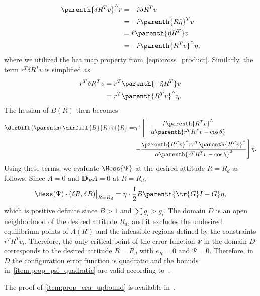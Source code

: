 \begin{align*}
    \parenth{\delta R^T v}^\wedge r &= - \hat{r} \delta R ^T v  \\
    &= - \hat{r} \parenth{R \hat \eta}^T v  \\
    &= \hat{r} \parenth{\hat{\eta} R^T } v  \\
    &= - \hat{r} \parenth{R^T v}^\wedge \eta ,
\end{align*}
where we utilized the hat map property from~\cref{eqn:cross_product}.
Similarly, the term \( r^T \delta R^T v \) is simplified as
\begin{align*}
    r^T \delta R^T v &= r^T \parenth{-\hat \eta R^T}v  \\
    &= r^T \parenth{R^T v}^\wedge \eta .
\end{align*}
The hessian of \( B(R) \) then becomes
\begin{align*}
    \dirDiff{\parenth{\dirDiff{B}{R}}}{R} =& \eta \cdot \left[ - \frac{ \hat r \parenth{R^T v}^\wedge}{\alpha \parenth{r^T R^T v - \cos \theta}} \right. \\ 
    & \left. - \frac{\parenth{R^T v}^\wedge r r^T \parenth{R^T v}^\wedge }{ \alpha\parenth{r^T R^T v - \cos \theta}^2}  \right] \eta .
\end{align*}
Using these terms, we evaluate \( \Hess{\Psi} \) at the desired attitude \( R = R_d \) as follows. Since $A=0$ and $\mathbf{D}_R A=0$ at $R=R_d$, 
\begin{align*}
    \Hess(\Psi)\cdot (\delta R,\delta R)\big|_{R=R_d} = \eta \cdot \frac{1}{2} B \parenth{\tr{G}I -  G} \eta , 
\end{align*}
which is positive definite since \( B > 1\) and \( \sum g_i > g_i\). 
The domain \( D \) is an open neighborhood of the desired attitude \( R_d \), and it excludes the undesired equilibrium points of \( A(R) \) and the infeasible regions defined by the constraints \( r^T R^T v_i \). 
Therefore, the only critical point of the error function $\Psi$ in the domain $D$ corresponds to the desired attitude $R=R_d$ with $e_R=0$ and $\Psi=0$. 
Therefore, in \( D \) the configuration error function is quadratic and the bounds in~\cref{item:prop_psi_quadratic} are valid according to~\cite[Proposition 6.30]{bullo2004}.

The proof of \cref{item:prop_era_upbound} is available in~\cite{LeeITCST13}.


